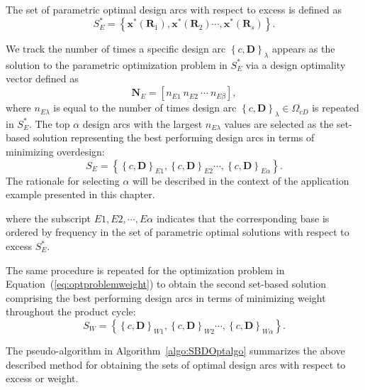 The set of parametric optimal design arcs with respect to excess is defined as
%
\begin{equation} \label{eq:SBDexcessopt}
	S_E^* = \left\{\mathbf{x}^*(\mathbf{R}_1),\mathbf{x}^*(\mathbf{R}_2)\cdots,\mathbf{x}^*(\mathbf{R}_s)\right\}.
\end{equation}

We track the number of times a specific design arc $\left\{c,\mathbf{D}\right\}_\lambda$ appears as the solution to the parametric optimization problem in $S_E^*$ via a design optimality vector defined as
%
\begin{equation} \label{eq:optimalityvec}
	\mathbf{N}_E = \left[n_{E1} ~ n_{E2} ~ \cdots ~ n_{E\beta}\right],%
\end{equation}
%
where $n_{E\lambda}$ is equal to the number of times design arc $\left\{c,\mathbf{D}\right\}_\lambda \in \Omega_{cD}$ is repeated in $S_E^*$. The top $\alpha$ design arcs with the largest $n_{E\lambda}$ values are selected as the set-based solution representing the best performing design arcs in terms of minimizing overdesign:
%
\begin{equation} \label{eq:SBDexcess}
	S_E = \left\{\left\{c,\mathbf{D}\right\}_{E1},\left\{c,\mathbf{D}\right\}_{E2}\cdots,\left\{c,\mathbf{D}\right\}_{E\alpha}\right\}.
\end{equation}
%
The rationale for selecting $\alpha$ will be described in the context of the application example presented in this chapter.

where the subscript $E1,E2,\cdots,E\alpha$ indicates that the corresponding base is ordered by frequency in the set of parametric optimal solutions with respect to excess $S_E^*$.

The same procedure is repeated for the optimization problem in Equation~(\ref{eq:optproblemweight}) to obtain the second set-based solution comprising the best performing design arcs in terms of minimizing weight throughout the product cycle:
%
\begin{equation} \label{eq:SBDweight}
	S_W = \left\{\left\{c,\mathbf{D}\right\}_{W1},\left\{c,\mathbf{D}\right\}_{W2}\cdots,\left\{c,\mathbf{D}\right\}_{W\alpha}\right\}.
\end{equation}

The pseudo-algorithm in Algorithm~\ref{algo:SBDOptalgo} summarizes the above described method for obtaining the sets of optimal design arcs with respect to excess or weight.

